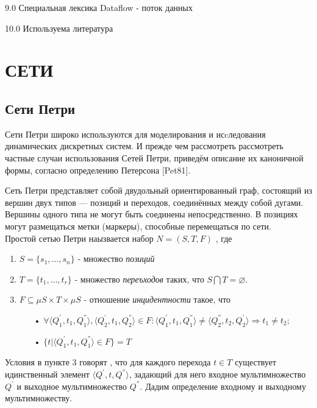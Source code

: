 \documentclass[a4paper,14pt]{article}
\begin{document}
9.0  Специальная лексика
 Dataflow - поток данных 


10.0 Используема литература

\section{СЕТИ}
\subsection{Сети Петри}
Сети Петри широко используются для моделирования и исcледования динамических дискретных систем. 
И прежде чем рассмотреть рассмотреть частные случаи использования Сетей Петри, приведём описание их каноничной формы, согласно определению Петерсона [Pet81].
\par Сеть Петри представляет собой двудольный ориентированный граф, состоящий из вершин двух типов — позиций и переходов, соединённых между собой дугами. Вершины одного типа не могут быть соединены непосредственно. В позициях могут размещаться метки (маркеры), способные перемещаться по сети.\\
Простой сетью Петри наызвается набор $N = (S,T,F)$ , где
\begin{enumerate}
\item $S = \lbrace s_{1},\ldots,s_{n} \rbrace$ - множество \textit{позиций}
\item $T = \lbrace t_{1},\ldots,t_{r} \rbrace$ - множество \textit{переъходов} таких, что $S \bigcap T = \varnothing$.
\item $F \subseteq \mu S \times T \times \mu S$ - отношение \textit{инцидентности} такое, что 
\begin{enumerate}
\item[•] $\forall \langle  Q_{1}^{'}, t_{1}, Q_{1}^{''} \rangle , \langle Q_{2}^{'}, t_{1}, Q_{2}^{''}\rangle \in F : \langle Q_{1}^{'}, t_{1}, Q_{1}^{''} \rangle \neq \langle Q_{2}^{''}, t_{2}, Q_{2}^{'}\rangle \Rightarrow t_{1} \neq t_{2};$
\item[•] $\lbrace t | \langle  Q_{1}^{'}, t_{1}, Q_{1}^{''} \rangle \in F \rbrace = T$
\end{enumerate}
\end{enumerate} 
Условия в пункте 3 говорят , что для каждого перехода $t \in T$ существует идинственный элемент $\langle Q^{'}, t, Q^{''} \rangle$, задающий для него входное мультимножество $Q^{'}$ и  выходное мультимножество $Q^{''}$. Дадим определение входному и выходному мультимножеству.
\end{document}
